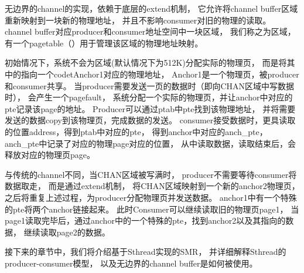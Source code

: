 无边界的channel的实现，依赖于底层的extend机制，
它允许将channel buffer区域重新映射到一块新的物理地址，
并且不影响consumer对旧的物理的读取。
channel buffer对应producer和consumer地址空间中一块区域，
我们称之为区域，有一个pagetable（）用于管理该区域的物理地址映射。

初始情况下，系统不会为区域(默认情况下为512K)分配实际的物理页，
而是将其中的指向一个codet{Anchor1}对应的物理地址，
Anchor1是一个物理页，被producer和consumer共享。
当producer需要发送一页的数据时（即向CHAN区域中写数据时），
会产生一个pagefault，
系统分配一个实际的物理页，并让anchor中对应的pte记录该page的地址。
Producer可以通过ptab中pte找到该物理地址，
并将需要发送的数据copy到该物理页，完成数据的发送。
consumer接受数据时，更具读取的位置address，得到ptab中对应的pte，
得到anchor中对应的anch\_pte，anch\_pte中记录了对应的物理page对应的位置，
从中读取数据，读取结束后，会释放对应的物理页page。

与传统的channel不同，当CHAN区域被写满时，
producer不需要等待consumer将数据取走，
而是通过extend机制，
将CHAN区域映射到一个新的anchor2物理页，
之后将重复上述过程，为producer分配物理页并发送数据。
anchor1中有一个特殊的pte将两个anchor链接起来。
此时Consumer可以继续读取旧的物理页page1，
当page1读取完毕后，通过anchor中的一个特殊的pte，找到anchor2以及其指向的数据，
继续读取page2的数据。

接下来的章节中，我们将介绍基于Sthread实现的SMR，
并详细解释Sthread的producer-consumer模型，
以及无边界的channel buffer是如何被使用。
